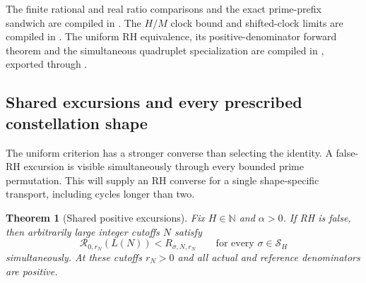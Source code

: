 \documentclass[11pt]{article}
\newtheorem{theorem}{Theorem}[section]
\theoremstyle{definition}
\begin{document}
\begin{flushleft}
The finite rational and real ratio comparisons and the exact
prime-prefix sandwich are compiled in
.
The $H/M$ clock bound and shifted-clock limits are compiled in
.
The uniform RH equivalence, its positive-denominator forward theorem
and the simultaneous quadruplet specialization are compiled in
,
exported through .
\end{flushleft}

\subsection{Shared excursions and every prescribed constellation shape}

The uniform criterion has a stronger converse than selecting the identity.
A false-RH excursion is visible simultaneously through every bounded
prime permutation. This will supply an RH converse for a single
shape-specific transport, including cycles longer than two.

\begin{theorem}[Shared positive excursions]
Fix $H\in\mathbb N$ and $\alpha>0$. If RH is false, then
arbitrarily large integer cutoffs $N$ satisfy
\[
 \mathcal R_{0,r_N}(L(N))<R_{\sigma,N,r_N}
       \qquad\text{for every }\sigma\in\mathcal S_H
\]
simultaneously. At these cutoffs $r_N>0$ and all actual and reference
denominators are positive.
\end{theorem}
\end{document}
